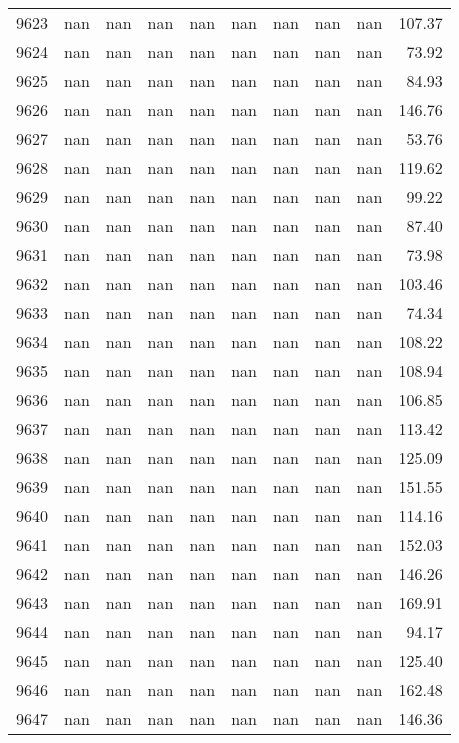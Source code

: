 \begin{tabular}{lrrrrrrrrr}
9623 & nan & nan & nan & nan & nan & nan & nan & nan & 107.37 \\
9624 & nan & nan & nan & nan & nan & nan & nan & nan & 73.92 \\
9625 & nan & nan & nan & nan & nan & nan & nan & nan & 84.93 \\
9626 & nan & nan & nan & nan & nan & nan & nan & nan & 146.76 \\
9627 & nan & nan & nan & nan & nan & nan & nan & nan & 53.76 \\
9628 & nan & nan & nan & nan & nan & nan & nan & nan & 119.62 \\
9629 & nan & nan & nan & nan & nan & nan & nan & nan & 99.22 \\
9630 & nan & nan & nan & nan & nan & nan & nan & nan & 87.40 \\
9631 & nan & nan & nan & nan & nan & nan & nan & nan & 73.98 \\
9632 & nan & nan & nan & nan & nan & nan & nan & nan & 103.46 \\
9633 & nan & nan & nan & nan & nan & nan & nan & nan & 74.34 \\
9634 & nan & nan & nan & nan & nan & nan & nan & nan & 108.22 \\
9635 & nan & nan & nan & nan & nan & nan & nan & nan & 108.94 \\
9636 & nan & nan & nan & nan & nan & nan & nan & nan & 106.85 \\
9637 & nan & nan & nan & nan & nan & nan & nan & nan & 113.42 \\
9638 & nan & nan & nan & nan & nan & nan & nan & nan & 125.09 \\
9639 & nan & nan & nan & nan & nan & nan & nan & nan & 151.55 \\
9640 & nan & nan & nan & nan & nan & nan & nan & nan & 114.16 \\
9641 & nan & nan & nan & nan & nan & nan & nan & nan & 152.03 \\
9642 & nan & nan & nan & nan & nan & nan & nan & nan & 146.26 \\
9643 & nan & nan & nan & nan & nan & nan & nan & nan & 169.91 \\
9644 & nan & nan & nan & nan & nan & nan & nan & nan & 94.17 \\
9645 & nan & nan & nan & nan & nan & nan & nan & nan & 125.40 \\
9646 & nan & nan & nan & nan & nan & nan & nan & nan & 162.48 \\
9647 & nan & nan & nan & nan & nan & nan & nan & nan & 146.36 \\

\end{tabular}
